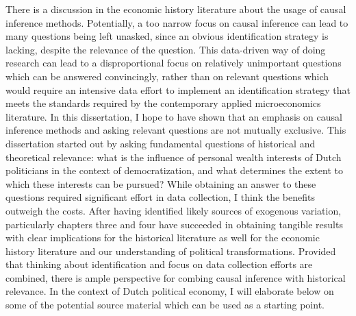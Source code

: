 There is a discussion in the economic history literature about the usage of causal inference methods. Potentially, a too narrow focus on causal inference can lead to many questions being left unasked, since an obvious identification strategy is lacking, despite the relevance of the question. This data-driven way of doing research can lead to a disproportional focus on relatively unimportant questions which can be answered convincingly, rather than on relevant questions which would require an intensive data effort to implement an identification strategy that meets the standards required by the contemporary applied microeconomics literature. In this dissertation, I hope to have shown that an emphasis on causal inference methods and asking relevant questions are not mutually exclusive. This dissertation started out by asking fundamental questions of historical and theoretical relevance: what is the influence of personal wealth interests of Dutch politicians in the context of democratization, and what determines the extent to which these interests can be pursued? While obtaining an answer to these questions required significant effort in data collection, I think the benefits outweigh the costs. After having identified likely sources of exogenous variation, particularly chapters three and four have succeeded in obtaining tangible results with clear implications for the historical literature as well for the economic history literature and our understanding of political transformations. Provided that thinking about identification and focus on data collection efforts are combined, there is ample perspective for combing causal inference with historical relevance. In the context of Dutch political economy, I will elaborate below on some of the potential source material which can be used as a starting point. 

